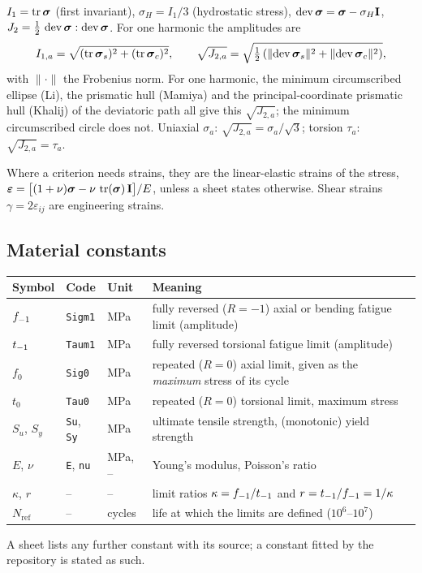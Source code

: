  $I_1 = \operatorname{tr}\boldsymbol\sigma$ (first invariant), $\sigma_H = I_1/3$ (hydrostatic stress),
$\operatorname{dev}\boldsymbol\sigma = \boldsymbol\sigma - \sigma_H\mathbf I$, $J_2 = \tfrac12\,\operatorname{dev}\boldsymbol\sigma:\operatorname{dev}\boldsymbol\sigma$. For one harmonic
the amplitudes are
\begin{equation}
I_{1,a} = \sqrt{(\operatorname{tr}\boldsymbol\sigma_s)^2 + (\operatorname{tr}\boldsymbol\sigma_c)^2},\qquad
\sqrt{J_{2,a}} = \sqrt{\tfrac12\left(\lVert\operatorname{dev}\boldsymbol\sigma_s\rVert^2 + \lVert\operatorname{dev}\boldsymbol\sigma_c\rVert^2\right)} ,
\label{eq:invariants}
\end{equation}
with $\lVert\cdot\rVert$ the Frobenius norm. For one harmonic, the minimum circumscribed ellipse
(Li), the prismatic hull (Mamiya) and the principal-coordinate prismatic hull (Khalij) of the
deviatoric path all give this $\sqrt{J_{2,a}}$; the minimum circumscribed circle does not.
Uniaxial $\sigma_a$: $\sqrt{J_{2,a}}=\sigma_a/\sqrt3$; torsion $\tau_a$: $\sqrt{J_{2,a}}=\tau_a$.

 Where a criterion needs strains, they are the linear-elastic strains of
the stress, $\boldsymbol\varepsilon = \bigl[(1+\nu)\boldsymbol\sigma - \nu\,\operatorname{tr}(\boldsymbol\sigma)\,\mathbf I\bigr]/E$, unless a sheet states
otherwise. Shear strains $\gamma = 2\varepsilon_{ij}$ are engineering strains.

\subsection{Material constants}

\begin{center}\small
\begin{tabular}{@{}lllp{80mm}@{}}
\toprule
Symbol & Code & Unit & Meaning\\\midrule
$f_{-1}$ & \texttt{Sigm1} & MPa & fully reversed ($R=-1$) axial or bending fatigue limit (amplitude)\\
$t_{-1}$ & \texttt{Taum1} & MPa & fully reversed torsional fatigue limit (amplitude)\\
$f_0$ & \texttt{Sig0} & MPa & repeated ($R=0$) axial limit, given as the \emph{maximum} stress of its cycle\\
$t_0$ & \texttt{Tau0} & MPa & repeated ($R=0$) torsional limit, maximum stress\\
$S_u$, $S_y$ & \texttt{Su}, \texttt{Sy} & MPa & ultimate tensile strength, (monotonic) yield strength\\
$E$, $\nu$ & \texttt{E}, \texttt{nu} & MPa, -- & Young's modulus, Poisson's ratio\\
$\kappa$, $r$ & -- & -- & limit ratios $\kappa = f_{-1}/t_{-1}$ and $r = t_{-1}/f_{-1} = 1/\kappa$\\
$N_\text{ref}$ & -- & cycles & life at which the limits are defined ($10^6$--$10^7$)\\
\bottomrule
\end{tabular}
\end{center}
A sheet lists any further constant with its source; a constant fitted by the repository is
stated as such.

